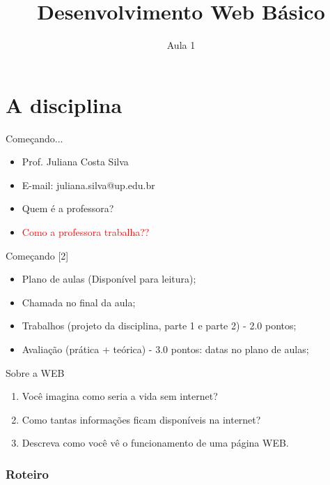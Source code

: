 \documentclass{beamer}
\title{Desenvolvimento Web Básico}
\subtitle{Aula 1}
\date{}
\begin{document}
\frame{
 \titlepage
}


\section{A disciplina}
\begin{frame}{Começando...}
  \begin{itemize}
   \item Prof. Juliana Costa Silva
    \item E-mail: juliana.silva@up.edu.br
    \item Quem é a professora?
    \pause \item \textcolor{red}{Como a professora trabalha??}
  \end{itemize}
\end{frame}
\begin{frame}{Começando [2]}
  \begin{itemize}
   \item Plano de aulas (Disponível para leitura);
   \item Chamada no final da aula;
    \item Trabalhos (projeto da disciplina, parte 1 e parte 2) - 2.0 pontos;
    \item Avaliação (prática + teórica) - 3.0 pontos: datas no plano de aulas;
  \end{itemize}
\end{frame}
\begin{frame}{Sobre a WEB}
  \begin{enumerate}
   \item Você imagina como seria a vida sem internet?
    \item Como tantas informações ficam disponíveis na internet?
    \item Descreva como você vê o funcionamento de uma página WEB.
  \end{enumerate}
\end{frame}
\begin{frame}
\frametitle{Roteiro} %
\tableofcontents %
\end{frame}
\end{document}
